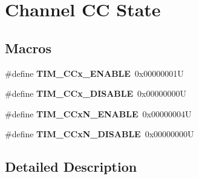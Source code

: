 \hypertarget{group___channel___c_c___state}{}\section{Channel CC State}
\label{group___channel___c_c___state}
\subsection*{Macros}
\begin{DoxyCompactItemize}
\item 
\mbox{\label{group___channel___c_c___state_ga7b214df0d5c67138de7bc84e937909f0}} 
\#define {\bfseries T\+I\+M\+\_\+\+C\+Cx\+\_\+\+E\+N\+A\+B\+LE}~0x00000001U
\item 
\mbox{\label{group___channel___c_c___state_ga5068d16e01778cd3bd09555013b2f4d3}} 
\#define {\bfseries T\+I\+M\+\_\+\+C\+Cx\+\_\+\+D\+I\+S\+A\+B\+LE}~0x00000000U
\item 
\mbox{\label{group___channel___c_c___state_ga69ecb0bf5dcd5ecf30af36d6fc00ea0d}} 
\#define {\bfseries T\+I\+M\+\_\+\+C\+Cx\+N\+\_\+\+E\+N\+A\+B\+LE}~0x00000004U
\item 
\mbox{\label{group___channel___c_c___state_ga241183326d83407f7cc7dbd292533240}} 
\#define {\bfseries T\+I\+M\+\_\+\+C\+Cx\+N\+\_\+\+D\+I\+S\+A\+B\+LE}~0x00000000U
\end{DoxyCompactItemize}


\subsection{Detailed Description}
